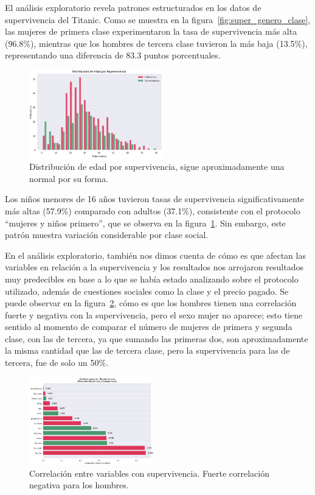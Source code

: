 \documentclass[conference]{IEEEtran}
\begin{document}
El análisis exploratorio revela patrones estructurados en los datos de supervivencia del Titanic. Como se muestra en la figura~\ref{fig:super_genero_clase}, las mujeres de primera clase experimentaron la tasa de supervivencia más alta (96.8\%), mientras que los hombres de tercera clase tuvieron la más baja (13.5\%), representando una diferencia de 83.3 puntos porcentuales.

\begin{figure}[htbp]
\centering
\includegraphics[width=0.52\textwidth]{figures/dist_edad_super.png}
\caption{Distribución de edad por supervivencia, sigue aproximadamente una normal por su forma.}
\label{fig:dist_edad_super}
\end{figure}

Los niños menores de 16 años tuvieron tasas de supervivencia significativamente más altas (57.9\%) comparado con adultos (37.1\%), consistente con el protocolo ``mujeres y niños primero'', que se observa en la figura~\ref{fig:dist_edad_super}. Sin embargo, este patrón muestra variación considerable por clase social.

En el análisis exploratorio, también nos dimos cuenta de cómo es que afectan las variables en relación a la supervivencia y los resultados nos arrojaron resultados muy predecibles en base a lo que se había estado analizando sobre el protocolo utilizado, además de cuestiones sociales como la clase y el precio pagado. Se puede observar en la figura~\ref{fig:Corr}, cómo es que los hombres tienen una correlación fuerte y negativa con la supervivencia, pero el sexo mujer no aparece; esto tiene sentido al momento de comparar el número de mujeres de primera y segunda clase, con las de tercera, ya que sumando las primeras dos, son aproximadamente la misma cantidad que las de tercera clase, pero la supervivencia para las de tercera, fue de solo un 50\%.

\begin{figure}[htbp]
\centering
\includegraphics[width=0.48\textwidth]{figures/Corr.png}
\caption{Correlación entre variables con supervivencia. Fuerte correlación negativa para los hombres.}
\label{fig:Corr}
\end{figure}
\end{document}
